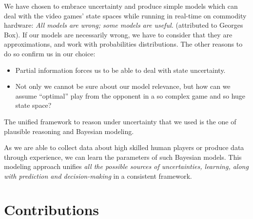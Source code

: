 We have chosen to embrace uncertainty and produce simple models which can deal with the video games' state spaces while running in real-time on commodity hardware: \textit{All models are wrong; some models are useful.} (attributed to Georges Box). If our models are necessarily wrong, we have to consider that they are approximations, and work with probabilities distributions. The other reasons to do so confirm us in our choice:
\begin{itemize}
    \item Partial information forces us to be able to deal with state uncertainty. 
    \item Not only we cannot be sure about our model relevance, but how can we assume ``optimal'' play from the opponent in a so complex game and so huge state space?
\end{itemize}
The unified framework to reason under uncertainty that we used is the one of plausible reasoning and Bayesian modeling.

As we are able to collect data about high skilled human players or produce data through experience, we can learn the parameters of such Bayesian models. This modeling approach unifies \textit{all the possible sources of uncertainties, learning, along with prediction and decision-making} in a consistent framework.

\section{Contributions}

